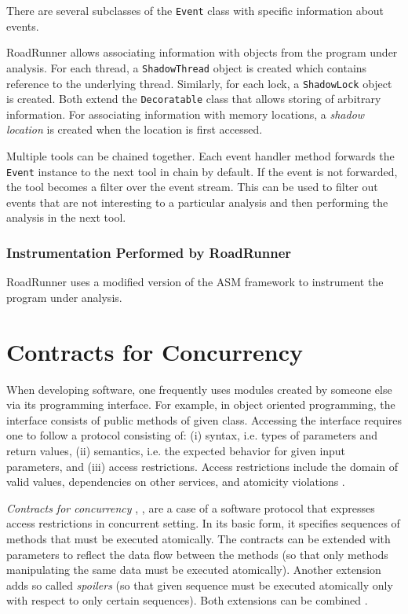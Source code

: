 There are several subclasses of the \texttt{Event} class with specific
information about events.

RoadRunner allows associating information with objects from the program under
analysis. For each thread, a \texttt{ShadowThread} object is created which
contains reference to the underlying thread. Similarly, for each lock, a
\texttt{ShadowLock} object is created. Both extend the \texttt{Decoratable}
class that allows storing of arbitrary information. For associating information
with memory locations, a \emph{shadow location} is created when the location is
first accessed.

Multiple tools can be chained together. Each event handler method forwards the
\texttt{Event} instance to the next tool in chain by default. If the event is
not forwarded, the tool becomes a filter over the event stream. This can be used
to filter out events that are not interesting to a particular analysis and then
performing the analysis in the next tool.

\subsection{Instrumentation Performed by RoadRunner}

RoadRunner uses a modified version of the ASM framework to instrument the
program under analysis.




\chapter{Contracts for Concurrency}
\label{chThree}


When developing software, one frequently uses modules created by someone else
via its programming interface. For example, in object oriented programming, the
interface consists of public methods of given class. Accessing the interface
requires one to follow a protocol consisting of: (i) syntax, i.e. types of
parameters and return values, (ii) semantics, i.e. the expected behavior for
given input parameters, and (iii) access restrictions. Access restrictions
include the domain of valid values, dependencies on other services, and
atomicity violations \cite{FITPUB11510}.

\emph{Contracts for concurrency} \cite{FITPUB10817},
\cite{DBLP:journals/corr/SousaDFL15}, are a case of a software protocol that
expresses access restrictions in concurrent setting. In its basic form, it
specifies sequences of methods that must be executed atomically. The contracts
can be extended with parameters to reflect the data flow between the methods (so
that only methods manipulating the same data must be executed atomically).
Another extension adds so called \emph{spoilers} (so that given sequence must be
executed atomically only with respect to only certain sequences). Both
extensions can be combined \cite{FITPUB11510}.

